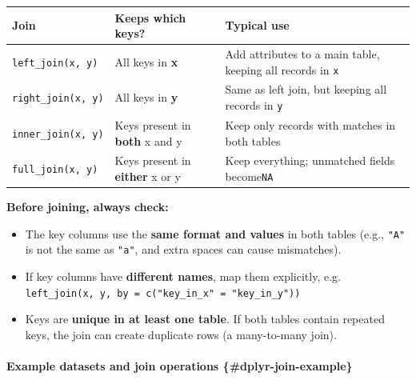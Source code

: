 \documentclass[
  10pt,
  b5paper,
  oneside]{book}
\begin{document}
\begin{longtable}[]{@{}
  >{\raggedright\arraybackslash}p{}
  >{\raggedright\arraybackslash}p{}
  >{\raggedright\arraybackslash}p{}@{}}
\toprule\noalign{}
\begin{minipage}[b]{\linewidth}\raggedright
Join
\end{minipage} & \begin{minipage}[b]{\linewidth}\raggedright
Keeps which keys?
\end{minipage} & \begin{minipage}[b]{\linewidth}\raggedright
Typical use
\end{minipage} \\
\midrule\noalign{}
\endhead
\bottomrule\noalign{}
\endlastfoot
\texttt{left\_join(x,\ y)} & All keys in \textbf{x} & Add attributes to a main table, keeping all records in \texttt{x} \\
\texttt{right\_join(x,\ y)} & All keys in \textbf{y} & Same as left join, but keeping all records in \texttt{y} \\
\texttt{inner\_join(x,\ y)} & Keys present in \textbf{both} x and y & Keep only records with matches in both tables \\
\texttt{full\_join(x,\ y)} & Keys present in \textbf{either} x or y & Keep everything; unmatched fields become\texttt{NA} \\
\end{longtable}

\textbf{Before joining, always check:}

\begin{itemize}
\item
  The key columns use the \textbf{same format and values} in both tables (e.g., \texttt{"A"} is not the same as \texttt{"a"}, and extra spaces can cause mismatches).
\item
  If key columns have \textbf{different names}, map them explicitly, e.g.
  \texttt{left\_join(x,\ y,\ by\ =\ c("key\_in\_x"\ =\ "key\_in\_y"))}
\item
  Keys are \textbf{unique in at least one table}. If both tables contain repeated keys, the join can create duplicate rows (a many-to-many join).
\end{itemize}

\paragraph*{Example datasets and join operations \{\#dplyr-join-example\}}\label{example-datasets-and-join-operations-dplyr-join-example}
\end{document}
